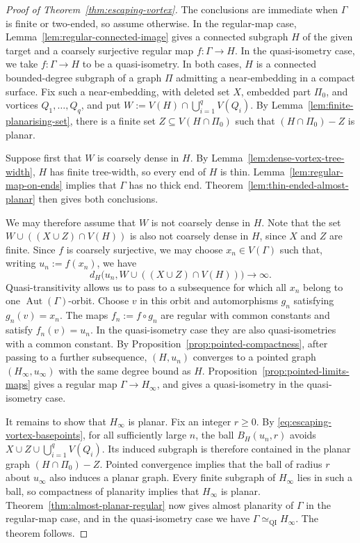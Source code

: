 \documentclass[a4paper]{amsart}
\begin{document}
\begin{proof}[Proof of Theorem~\ref{thm:escaping-vortex}]
The conclusions are immediate when $\Gamma$ is finite or two-ended, so assume otherwise.
In the regular-map case, Lemma~\ref{lem:regular-connected-image} gives a connected subgraph $H$ of the given target and a coarsely surjective regular map $f:\Gamma\to H$.
In the quasi-isometry case, we take $f:\Gamma\to H$ to be a quasi-isometry.
In both cases, $H$ is a connected bounded-degree subgraph of a graph $\Pi$ admitting a near-embedding in a compact surface.
Fix such a near-embedding, with deleted set $X$, embedded part $\Pi_0$, and vortices $Q_1,\ldots,Q_q$, and put $W:=V(H)\cap\bigcup_{i=1}^q V(Q_i)$.
By Lemma~\ref{lem:finite-planarising-set}, there is a finite set $Z\subseteq V(H\cap\Pi_0)$ such that $(H\cap\Pi_0)-Z$ is planar.

Suppose first that $W$ is coarsely dense in $H$.
By Lemma~\ref{lem:dense-vortex-tree-width}, $H$ has finite tree-width, so every end of $H$ is thin.
Lemma~\ref{lem:regular-map-on-ends} implies that $\Gamma$ has no thick end.
Theorem~\ref{lem:thin-ended-almost-planar} then gives both conclusions.

We may therefore assume that $W$ is not coarsely dense in $H$.
Note that the set $W\cup((X\cup Z)\cap V(H))$ is also not coarsely dense in $H$, since $X$ and $Z$ are finite. 
Since $f$ is coarsely surjective, we may choose $x_n\in V(\Gamma)$ such that, writing $u_n:=f(x_n)$, we have
\begin{equation}\label{eq:escaping-vortex-basepoints}
d_H\bigl(u_n,W\cup((X\cup Z)\cap V(H))\bigr)\longrightarrow\infty.
\end{equation}
Quasi-transitivity allows us to pass to a subsequence for which all $x_n$ belong to one $\operatorname{Aut}(\Gamma)$-orbit.
Choose $v$ in this orbit and automorphisms $g_n$ satisfying $g_n(v)=x_n$.
The maps $f_n:=f\circ g_n$ are regular with common constants and satisfy $f_n(v)=u_n$.
In the quasi-isometry case they are also quasi-isometries with a common constant.
By Proposition~\ref{prop:pointed-compactness}, after passing to a further subsequence, $(H,u_n)$ converges to a pointed graph $(H_\infty,u_\infty)$ with the same degree bound as $H$.
Proposition~\ref{prop:pointed-limits-maps} gives a regular map $\Gamma\to H_\infty$, and gives a quasi-isometry in the quasi-isometry case.

It remains to show that $H_\infty$ is planar. 
Fix an integer $r\geq0$.
By \eqref{eq:escaping-vortex-basepoints}, for all sufficiently large $n$, the ball $B_H(u_n,r)$ avoids $X\cup Z\cup\bigcup_{i=1}^q V(Q_i)$.
Its induced subgraph is therefore contained in the planar graph $(H\cap\Pi_0)-Z$.
Pointed convergence implies that the ball of radius $r$ about $u_\infty$ also induces a planar graph.
Every finite subgraph of $H_\infty$ lies in such a ball, so compactness of planarity implies that $H_\infty$ is planar.
Theorem~\ref{thm:almost-planar-regular} now gives almost planarity of $\Gamma$ in the regular-map case, and in the quasi-isometry case we have $\Gamma\simeq_{\mathrm{QI}}H_\infty$. The theorem follows. 
\end{proof}
\end{document}
